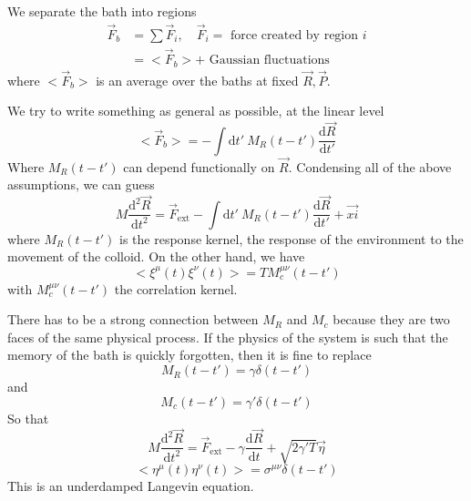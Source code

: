 \documentclass[a4paper]{book}
\theoremstyle{definition}
\theoremstyle{remark}
\begin{document}
We separate the bath into regions 
\begin{equation}
    \begin{aligned}
        \vec{F}_b &= \sum \vec{F}_i, \quad \vec{F}_i = \text{ force created by region }i \\
        &= <\vec{F}_b> + \text{ Gaussian fluctuations}
    \end{aligned}
\end{equation}
where $<\vec{F}_b>$ is an average over the baths at fixed $\vec{R}, \vec{P}$. \par \medskip 
We try to write something as general as possible, at the linear level
\begin{equation}
    <\vec{F}_b> = -\int \text{d}t'~ M_R(t-t')\frac{\text{d}\vec{R}}{\text{d}t'}
\end{equation}
Where $M_R(t-t')$ can depend functionally on $\vec{R}$. Condensing all of the above assumptions, we can guess
\begin{equation}
    M\frac{\text{d}^2 \vec{R}}{\text{d}t^2} = \vec{F}_{\text{ext}} - \int \text{d}t'~ M_R(t-t')\frac{\text{d}\vec{R}}{\text{d}t'} + \vec{xi}
\end{equation} 
where $M_R(t-t')$ is the response kernel, the response of the environment to the movement of the colloid. On the other hand, we have 
\begin{equation}
    <\xi^\mu(t)\xi^\nu(t)> = TM^{\mu\nu}_c (t-t')
\end{equation}
with $M^{\mu\nu}_c (t-t')$ the correlation kernel. \par \medskip 

There has to be a strong connection between $M_R$ and $M_c$ because they are two faces of the same physical process. If the physics of the system is such that the memory of the bath is quickly forgotten, then it is fine to replace 
\begin{equation}
    M_R(t-t') = \gamma \delta(t-t')
\end{equation}
and 
\begin{equation}
    M_c(t-t') = \gamma' \delta(t-t')
\end{equation}
So that 
\begin{equation}
    M \frac{\text{d}^2 \vec{R}}{\text{d}t^2} = \vec{F}_{\text{ext}} - \gamma \frac{\text{d}\vec{R}}{\text{d}t} + \sqrt{2\gamma' T}\vec{\eta}
\end{equation}
\begin{equation}
    <\eta^\mu(t)\eta^\nu(t)> = \sigma^{\mu\nu}\delta(t-t')
\end{equation}
This is an underdamped Langevin equation. \par \medskip 
\end{document}
